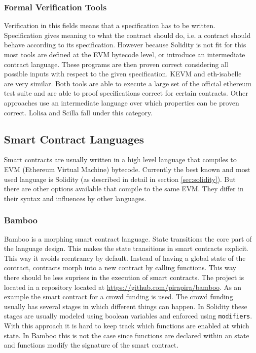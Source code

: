 \documentclass[a4paper]{article}
\begin{document}
\subsubsection{Formal Verification Tools}
Verification in this fields means that a specification has to be written. Specification gives meaning to what the contract should do, i.e. a contract should behave according to its specification. However because Solidity is not fit for this most tools are defined at the EVM bytecode level, or introduce an intermediate contract language. These programs are then proven correct considering all possible inputs with respect to the given specification. KEVM \cite{hildenbrandt2017kevm} and eth-isabelle \cite{hirai2017defining} are very similar. Both tools are able to execute a large set of the official ethereum test suite and are able to proof specifications correct for certain contracts. Other approaches use an intermediate language over which properties can be proven correct. Lolisa \cite{yang2018lolisa} and Scilla \cite{sergey2018scilla} fall under this category. 

\subsection{Smart Contract Languages}
Smart contracts are usually written in a high level language that compiles to EVM (Ethereum Virtual Machine) bytecode. Currently the best known and most used language is Solidity (as described in detail in section \ref{sec:solidity}). But there are other options available that compile to the same EVM. They differ in their syntax and influences by other languages.  
\subsubsection{Bamboo}
Bamboo is a morphing smart contract language. State transitions the core part of the language design. This makes the state transitions in smart contracts explicit. This way it avoids reentrancy by default. Instead of having a global state of the contract, contracts morph into a new contract by calling functions. This way there should be less suprises in the execution of smart contracts. The project is located in a repository located at \url{https://github.com/pirapira/bamboo}. As an example the smart contract for a crowd funding is used. The crowd funding usually has several stages in which different things can happen. In Solidity these stages are usually modeled using boolean variables and enforced using \texttt{modifiers}. With this approach it is hard to keep track which functions are enabled at which state. In Bamboo this is not the case since functions are declared within an state and functions modify the signature of the smart contract. 
\end{document}
